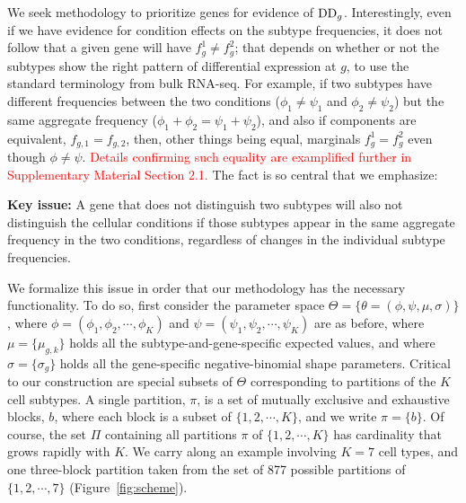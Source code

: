 \documentclass[aoas,preprint]{imsart}
\begin{document}
We seek methodology to prioritize genes for evidence
of ${\rm DD}_g$.  Interestingly, even if we have evidence for condition effects
on the subtype frequencies, it does not follow that a given
gene will have $f^1_g \neq f^2_g$; that depends on whether or not the subtypes
show the right pattern of differential expression at $g$, to use the 
standard terminology from bulk RNA-seq.  For example, if two subtypes have 
different frequencies between the two conditions ($\phi_1 \neq \psi_1$ and 
 $\phi_2 \neq \psi_2$) but the same aggregate frequency
($\phi_1+\phi_2 = \psi_1 + \psi_2$),  and also  if components are equivalent, $f_{g,1} = f_{g,2}$,
then, other things being equal, marginals $f^1_g = f^2_g$ even though $\phi \neq \psi$. 
\textcolor{red}{Details confirming such equality are examplified further in Supplementary Material Section 2.1.} The fact is so central that we emphasize:


\noindent
{\bf Key issue:} A gene that does not distinguish two subtypes will also not distinguish
the cellular conditions if those subtypes appear in the same aggregate frequency
in the two conditions, regardless of changes in the individual subtype 
frequencies. 

 We formalize this issue in order that our methodology
has the necessary functionality.  To do so,  first consider the parameter space 
$\Theta = \{ \theta=(\phi, \psi,\mu, \sigma)  \}$,
where $\phi=(\phi_1, \phi_2, \cdots, \phi_K)$ and $\psi=(\psi_1, \psi_2, \cdots, \psi_K)$ 
are as before, where $\mu = \{ \mu_{g,k} \}$ holds  all the subtype-and-gene-specific expected
values, and where $\sigma = \{ \sigma_g \}$ holds all the gene-specific negative-binomial
shape parameters.  Critical to our construction are special subsets of $\Theta$ corresponding
to partitions of the $K$ cell subtypes.  A single partition, $\pi$, is a set of
mutually exclusive and exhaustive blocks, $b$, where each block is a subset of $\{1, 2, 
\cdots, K\}$, and we write $\pi = \{ b \}$.  Of course,
the set $\Pi$ containing all partitions $\pi$ of $\{1,2, \cdots, K\}$
 has cardinality that grows rapidly with $K$. 
 We carry along an example
involving $K=7$ cell types, and one three-block partition taken
from the set of 877 possible partitions of $\{1, 2, \cdots, 7\}$ (Figure~\ref{fig:scheme}).
\end{document}
